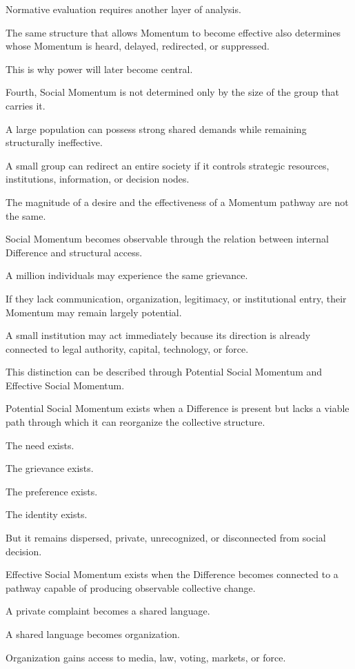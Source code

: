 Normative evaluation requires another layer of analysis.

The same structure that allows Momentum to become effective also determines whose Momentum is heard, delayed, redirected, or suppressed.

This is why power will later become central.

Fourth, Social Momentum is not determined only by the size of the group that carries it.

A large population can possess strong shared demands while remaining structurally ineffective.

A small group can redirect an entire society if it controls strategic resources, institutions, information, or decision nodes.

The magnitude of a desire and the effectiveness of a Momentum pathway are not the same.

Social Momentum becomes observable through the relation between internal Difference and structural access.

A million individuals may experience the same grievance.

If they lack communication, organization, legitimacy, or institutional entry, their Momentum may remain largely potential.

A small institution may act immediately because its direction is already connected to legal authority, capital, technology, or force.

This distinction can be described through Potential Social Momentum and Effective Social Momentum.

Potential Social Momentum exists when a Difference is present but lacks a viable path through which it can reorganize the collective structure.

The need exists.

The grievance exists.

The preference exists.

The identity exists.

But it remains dispersed, private, unrecognized, or disconnected from social decision.

Effective Social Momentum exists when the Difference becomes connected to a pathway capable of producing observable collective change.

A private complaint becomes a shared language.

A shared language becomes organization.

Organization gains access to media, law, voting, markets, or force.

